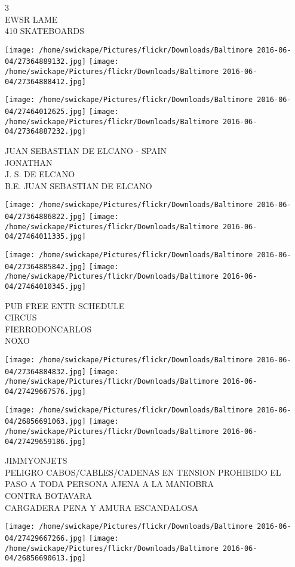 \documentclass[10pt,letterpaper]{article}
\begin{document}
3\\
EWSR LAME\\
410 SKATEBOARDS
\pagebreak

\texttt{[image: /home/swickape/Pictures/flickr/Downloads/Baltimore 2016-06-04/27364889132.jpg]}
\texttt{[image: /home/swickape/Pictures/flickr/Downloads/Baltimore 2016-06-04/27364888412.jpg]}

\texttt{[image: /home/swickape/Pictures/flickr/Downloads/Baltimore 2016-06-04/27464012625.jpg]}
\texttt{[image: /home/swickape/Pictures/flickr/Downloads/Baltimore 2016-06-04/27364887232.jpg]}

JUAN SEBASTIAN DE ELCANO {-} SPAIN\\
JONATHAN\\
J. S. DE ELCANO\\
B.E. JUAN SEBASTIAN DE ELCANO
\pagebreak

\texttt{[image: /home/swickape/Pictures/flickr/Downloads/Baltimore 2016-06-04/27364886822.jpg]}
\texttt{[image: /home/swickape/Pictures/flickr/Downloads/Baltimore 2016-06-04/27464011335.jpg]}

\texttt{[image: /home/swickape/Pictures/flickr/Downloads/Baltimore 2016-06-04/27364885842.jpg]}
\texttt{[image: /home/swickape/Pictures/flickr/Downloads/Baltimore 2016-06-04/27464010345.jpg]}

PUB FREE ENTR SCHEDULE\\
CIRCUS\\
FIERRODONCARLOS\\
NOXO
\pagebreak

\texttt{[image: /home/swickape/Pictures/flickr/Downloads/Baltimore 2016-06-04/27364884832.jpg]}
\texttt{[image: /home/swickape/Pictures/flickr/Downloads/Baltimore 2016-06-04/27429667576.jpg]}

\texttt{[image: /home/swickape/Pictures/flickr/Downloads/Baltimore 2016-06-04/26856691063.jpg]}
\texttt{[image: /home/swickape/Pictures/flickr/Downloads/Baltimore 2016-06-04/27429659186.jpg]}

JIMMYONJETS\\
PELIGRO CABOS/CABLES/CADENAS EN TENSION PROHIBIDO EL PASO A TODA PERSONA AJENA A LA MANIOBRA\\
CONTRA BOTAVARA\\
CARGADERA PENA Y AMURA ESCANDALOSA
\pagebreak

\texttt{[image: /home/swickape/Pictures/flickr/Downloads/Baltimore 2016-06-04/27429667266.jpg]}
\texttt{[image: /home/swickape/Pictures/flickr/Downloads/Baltimore 2016-06-04/26856690613.jpg]}
\end{document}
